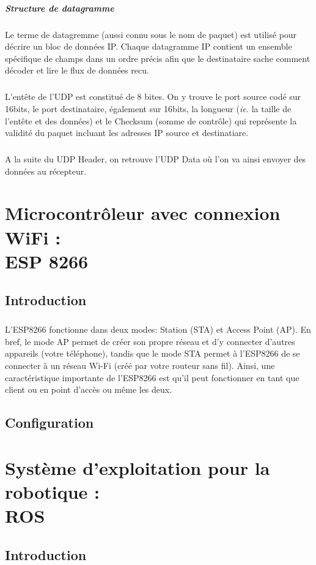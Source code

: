 \documentclass[12pt, oneside]{report}
\begin{document}
        \paragraph{Structure de datagramme}{Le terme de datagremme (aussi connu sous le nom de paquet) est utilisé pour décrire un bloc de données IP. Chaque datagramme IP contient un ensemble spécifique de champs dans un ordre précis afin que le destinataire sache comment décoder et lire le flux de données recu.}
        \paragraph{}{L'entête de l'UDP est constitué de 8 bites. On y trouve le port source codé sur 16bits, le port destinataire, également sur 16bits, la longueur (\textit{ie.} la taille de l'entête et des données) et le Checksum (somme de contrôle) qui représente la validité du paquet incluant les adresses IP source et destinatiare.}
        \paragraph{}{A la suite du UDP Header, on retrouve l'UDP Data où l'on va ainsi envoyer des données au récepteur.}
\chapter{Microcontrôleur avec connexion WiFi : \\ ESP 8266}
\section{Introduction}
        \paragraph{}{L'ESP8266 fonctionne dans deux modes: Station (STA) et Access Point (AP). En bref, le mode AP permet de créer son propre réseau et d’y connecter d’autres appareils (votre téléphone), tandis que le mode STA permet à l’ESP8266 de se connecter à un réseau Wi-Fi (créé par votre routeur sans fil). Ainsi, une caractéristique importante de l'ESP8266 est qu'il peut fonctionner en tant que client ou en point d'accès ou même les deux.
        }
\section{Configuration}
        \paragraph{}
\chapter{Système d'exploitation pour la robotique : \\ ROS}
\section{Introduction}
        \paragraph{}
\end{document}
